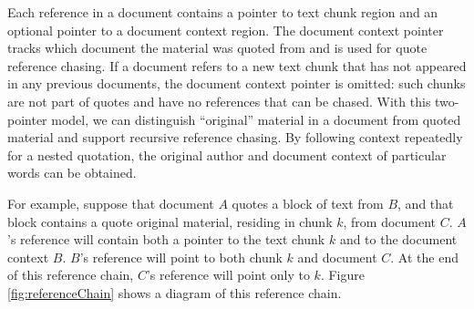 \documentclass{acm_proc_article-sp}
\begin{document}
Each reference in a document contains a pointer to text chunk region and an optional pointer to a document context region.
The document context pointer tracks which document the material was quoted from and is used for quote reference chasing.
If a document refers to a new text chunk that has not appeared in any previous documents, the document context pointer is omitted:  such chunks are not part of quotes and have no references that can be chased.
With this two-pointer model, we can distinguish ``original'' material in a document from quoted material and support recursive reference chasing.
By following context repeatedly for a nested quotation, the original author and document context of particular words can be obtained.

For example, suppose that document $A$ quotes a block of text from $B$, and that block contains a quote original material, residing in chunk $k$, from document $C$.  
$A$'s reference will contain both a pointer to the text chunk $k$ and to the document context $B$.  
$B$'s reference will point to both chunk $k$ and document $C$.  
At the end of this reference chain, $C$'s reference will point only to $k$.
Figure \ref{fig:referenceChain} shows a diagram of this reference chain.
\end{document}
